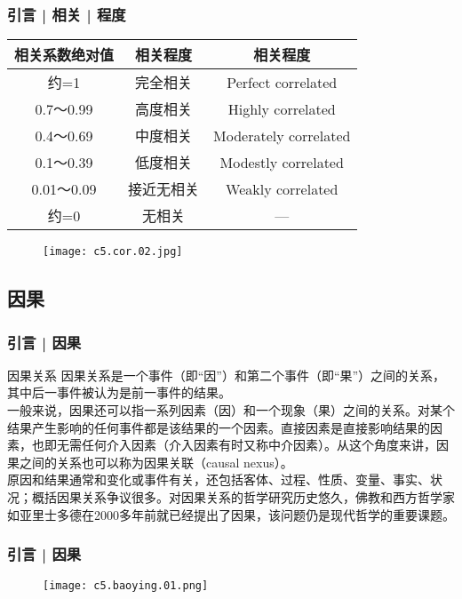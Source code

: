 \begin{frame}
  \frametitle{引言 | 相关 | 程度}
  \begin{table}
    \centering
    \begin{tabular}{ccc}
      \hline
      \rowcolor{blue!50} 相关系数绝对值 & 相关程度 & 相关程度\\
      \hline
      约=1 & 完全相关 & Perfect correlated\\
      0.7～0.99 & 高度相关 & Highly correlated\\
      0.4～0.69 & 中度相关 & Moderately correlated\\
      0.1～0.39 & 低度相关 & Modestly correlated\\
      0.01～0.09 & 接近无相关 & Weakly correlated\\
      约=0 & 无相关 & ---\\
      \hline
    \end{tabular}
  \end{table}
  \begin{figure}
    \centering
    \texttt{[image: c5.cor.02.jpg]}
  \end{figure}
\end{frame}

\subsection{因果}
\begin{frame}
  \frametitle{引言 | 因果}
  \begin{block}{因果关系}
    因果关系是一个事件（即“因”）和第二个事件（即“果”）之间的关系，其中后一事件被认为是前一事件的结果。\\
    \vspace{0.5em}
一般来说，因果还可以指一系列因素（因）和一个现象（果）之间的关系。对某个结果产生影响的任何事件都是该结果的一个因素。直接因素是直接影响结果的因素，也即无需任何介入因素（介入因素有时又称中介因素）。从这个角度来讲，因果之间的关系也可以称为因果关联（causal nexus）。\\
    \vspace{0.5em}
原因和结果通常和变化或事件有关，还包括客体、过程、性质、变量、事实、状况；概括因果关系争议很多。对因果关系的哲学研究历史悠久，佛教和西方哲学家如亚里士多德在2000多年前就已经提出了因果，该问题仍是现代哲学的重要课题。
  \end{block}
\end{frame}

\begin{frame}
  \frametitle{引言 | 因果}
  \begin{figure}
    \centering
    \texttt{[image: c5.baoying.01.png]}
  \end{figure}
\end{frame}

